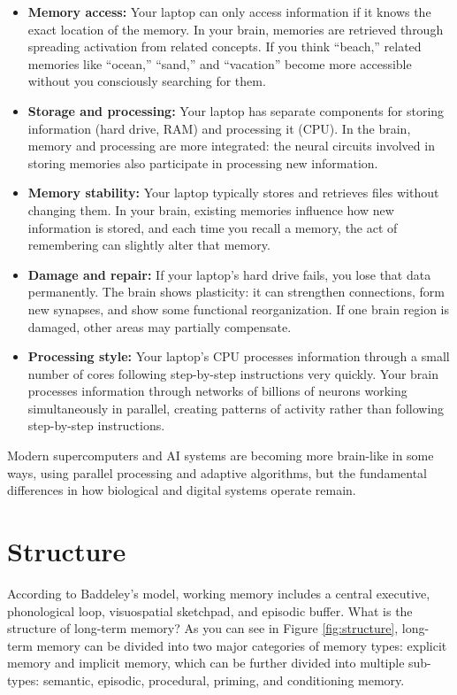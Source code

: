 \documentclass[
]{krantz}
\providecommand{\tightlist}{%
  \setlength{\itemsep}{0pt}\setlength{\parskip}{0pt}}
\begin{document}
\begin{itemize}
\tightlist
\item
  \textbf{Memory access:} Your laptop can only access information if it knows the exact location of the memory. In your brain, memories are retrieved through spreading activation from related concepts. If you think ``beach,'' related memories like ``ocean,'' ``sand,'' and ``vacation'' become more accessible without you consciously searching for them.
\item
  \textbf{Storage and processing:} Your laptop has separate components for storing information (hard drive, RAM) and processing it (CPU). In the brain, memory and processing are more integrated: the neural circuits involved in storing memories also participate in processing new information.
\item
  \textbf{Memory stability:} Your laptop typically stores and retrieves files without changing them. In your brain, existing memories influence how new information is stored, and each time you recall a memory, the act of remembering can slightly alter that memory.
\item
  \textbf{Damage and repair:} If your laptop's hard drive fails, you lose that data permanently. The brain shows plasticity: it can strengthen connections, form new synapses, and show some functional reorganization. If one brain region is damaged, other areas may partially compensate.
\item
  \textbf{Processing style:} Your laptop's CPU processes information through a small number of cores following step-by-step instructions very quickly. Your brain processes information through networks of billions of neurons working simultaneously in parallel, creating patterns of activity rather than following step-by-step instructions.
\end{itemize}

Modern supercomputers and AI systems are becoming more brain-like in some ways, using parallel processing and adaptive algorithms, but the fundamental differences in how biological and digital systems operate remain.

\section{Structure}\label{structure}

According to Baddeley's model, working memory includes a central executive, phonological loop, visuospatial sketchpad, and episodic buffer. What is the structure of long-term memory? As you can see in Figure \ref{fig:structure}, long-term memory can be divided into two major categories of memory types: explicit memory and implicit memory, which can be further divided into multiple sub-types: semantic, episodic, procedural, priming, and conditioning memory.
\end{document}
